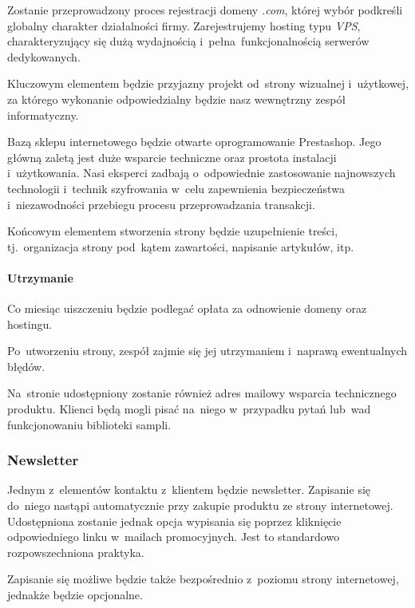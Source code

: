 \documentclass[12pt]{article}
\begin{document}
Zostanie przeprowadzony proces rejestracji domeny \textit{.com}, której wybór podkreśli globalny charakter działalności firmy.
Zarejestrujemy hosting typu \textit{VPS}, charakteryzujący się dużą wydajnością i~pełna~funkcjonalnością serwerów dedykowanych.

Kluczowym elementem będzie przyjazny projekt od~strony wizualnej i~użytkowej, za którego wykonanie odpowiedzialny będzie nasz wewnętrzny zespół informatyczny.

Bazą sklepu internetowego będzie otwarte oprogramowanie Prestashop.
Jego główną zaletą jest duże wsparcie techniczne oraz prostota instalacji i~użytkowania.
Nasi eksperci zadbają o~odpowiednie zastosowanie najnowszych technologii i~technik szyfrowania w~celu zapewnienia bezpieczeństwa i~niezawodności przebiegu procesu przeprowadzania transakcji.

Końcowym elementem stworzenia strony będzie uzupełnienie treści, tj.~organizacja strony pod~kątem zawartości, napisanie artykułów, itp.

\paragraph{Utrzymanie}

Co miesiąc uiszczeniu będzie podlegać opłata za odnowienie domeny oraz hostingu.

Po~utworzeniu strony, zespół zajmie się jej utrzymaniem i~naprawą ewentualnych błędów.

Na~stronie udostępniony zostanie również adres mailowy wsparcia technicznego produktu.
Klienci będą mogli pisać na~niego w~przypadku pytań lub~wad funkcjonowaniu biblioteki sampli.

\subsubsection{Newsletter}

Jednym z~elementów kontaktu z~klientem będzie newsletter.
Zapisanie się do~niego nastąpi automatycznie przy zakupie produktu ze strony internetowej.
Udostępniona zostanie jednak opcja wypisania się poprzez kliknięcie odpowiedniego linku w~mailach promocyjnych.
Jest to standardowo rozpowszechniona praktyka.

Zapisanie się możliwe będzie także bezpośrednio z~poziomu strony internetowej, jednakże będzie opcjonalne.
\end{document}
